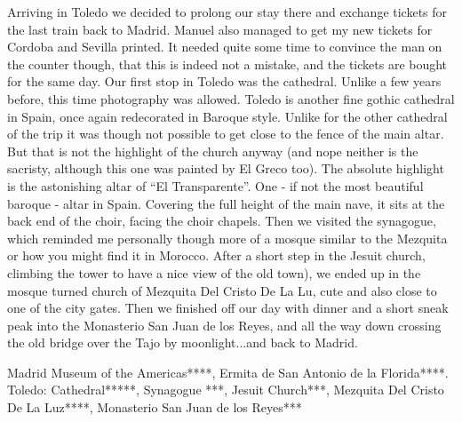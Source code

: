 Arriving in Toledo we decided to prolong our stay there and exchange tickets for the last train back to Madrid. Manuel also managed to get my new tickets for Cordoba and Sevilla printed. It needed quite some time to convince the man on the counter though, that this is indeed not a mistake, and the tickets are bought for the same day. Our first stop in Toledo was the cathedral. Unlike a few years before, this time photography was allowed. Toledo is another fine gothic cathedral in Spain, once again redecorated in Baroque style. Unlike for the other cathedral of the trip it was though not possible to get close to the fence of the main altar. But that is not the highlight of the church anyway (and nope neither is the sacristy, although this one was painted by El Greco too). The absolute highlight is the astonishing altar of ``El Transparente''. One - if not the most beautiful baroque - altar in Spain. Covering the full height of the main nave, it sits at the back end of the choir, facing the choir chapels. Then we visited the synagogue, which reminded me personally though more of a mosque similar to the Mezquita or how you might find it in Morocco. After a short step in the Jesuit church, climbing the tower to have a nice view of the old town), we ended up in the mosque turned church of Mezquita Del Cristo De La Lu, cute and also close to one of the city gates. Then we finished off our day with dinner and a short sneak peak into the Monasterio San Juan de los Reyes, and all the way down crossing the old bridge over the Tajo by moonlight...and back to Madrid.

Madrid
Museum of the Americas****,
Ermita de San Antonio de la Florida****.\\
Toledo:
Cathedral*****,
Synagogue ***,
Jesuit Church***,
Mezquita Del Cristo De La Luz****,
Monasterio San Juan de los Reyes***\\

